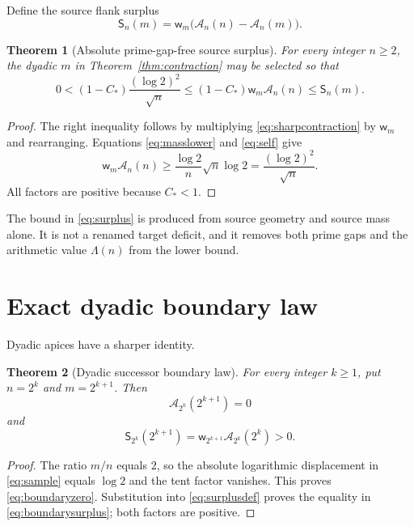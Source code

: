 \documentclass[11pt]{article}
\newtheorem{theorem}{Theorem}[section]
\newcommand{\Lam}{\Lambda}
\newcommand{\A}{\mathcal A}
\newcommand{\w}{\mathsf w}
\newcommand{\Sur}{\mathsf S}
\begin{document}
Define the source flank surplus
\begin{equation}\label{eq:surplusdef}
 \Sur_n(m)=\w_m\bigl(\A_n(n)-\A_n(m)\bigr).
\end{equation}

\begin{theorem}[Absolute prime-gap-free source surplus]\label{thm:surplus}
For every integer $n\ge2$, the dyadic $m$ in Theorem~\ref{thm:contraction} may be selected so that
\begin{equation}\label{eq:surplus}
 0<(1-C_*)\frac{(\log2)^2}{\sqrt n}
 \le (1-C_*)\w_m\A_n(n)
 \le \Sur_n(m).
\end{equation}
\end{theorem}

\begin{proof}
The right inequality follows by multiplying \eqref{eq:sharpcontraction} by $\w_m$ and
rearranging.  Equations \eqref{eq:masslower} and \eqref{eq:self} give
\[
 \w_m\A_n(n)\ge\frac{\log2}{n}\sqrt n\log2
 =\frac{(\log2)^2}{\sqrt n}.
\]
All factors are positive because $C_*<1$.
\end{proof}

The bound in \eqref{eq:surplus} is produced from source geometry and source mass alone.  It is not
a renamed target deficit, and it removes both prime gaps and the arithmetic value $\Lam(n)$ from
the lower bound.

\section{Exact dyadic boundary law}\leavevmode\par

Dyadic apices have a sharper identity.

\begin{theorem}[Dyadic successor boundary law]\label{thm:boundary}
For every integer $k\ge1$, put $n=2^k$ and $m=2^{k+1}$.  Then
\begin{equation}\label{eq:boundaryzero}
 \A_{2^k}(2^{k+1})=0
\end{equation}
and
\begin{equation}\label{eq:boundarysurplus}
 \Sur_{2^k}(2^{k+1})
 =\w_{2^{k+1}}\A_{2^k}(2^k)>0.
\end{equation}
\end{theorem}

\begin{proof}
The ratio $m/n$ equals $2$, so the absolute logarithmic displacement in
\eqref{eq:sample} equals $\log2$ and the tent factor vanishes.  This proves
\eqref{eq:boundaryzero}.  Substitution into \eqref{eq:surplusdef} proves the equality in
\eqref{eq:boundarysurplus}; both factors are positive.
\end{proof}
\end{document}
